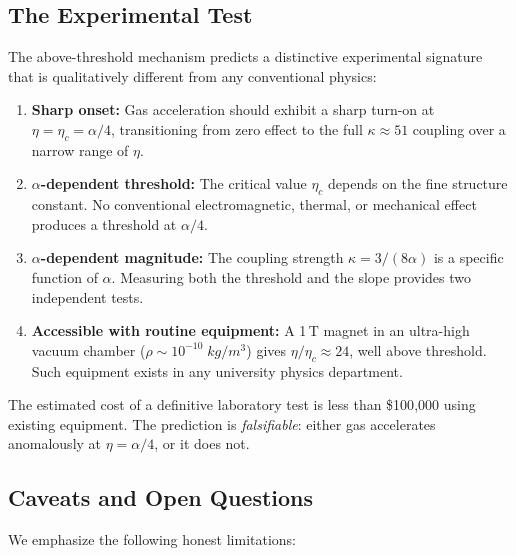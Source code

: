 \documentclass[twocolumn,prl,superscriptaddress,nofootinbib,longbibliography,floatfix]{revtex4-2}
\begin{document}
\subsection{The Experimental Test}\label{ssec:threshold-experiment}

The above-threshold mechanism predicts a distinctive experimental
signature that is qualitatively different from any conventional physics:

\begin{enumerate}[label=(\roman*)]
\item \textbf{Sharp onset:} Gas acceleration should exhibit a sharp turn-on
at $\eta = \eta_c = \alpha/4$, transitioning from zero effect to the
full $\kappa \approx 51$ coupling over a narrow range of $\eta$.

\item \textbf{$\alpha$-dependent threshold:} The critical value $\eta_c$
depends on the fine structure constant.  No conventional electromagnetic,
thermal, or mechanical effect produces a threshold at $\alpha/4$.

\item \textbf{$\alpha$-dependent magnitude:} The coupling strength
$\kappa = 3/(8\alpha)$ is a specific function of $\alpha$.  Measuring
both the threshold and the slope provides two independent tests.

\item \textbf{Accessible with routine equipment:} A 1\,T magnet in an
ultra-high vacuum chamber ($\rho \sim 10^{-10}\;\si{kg/m^3}$) gives
$\eta/\eta_c \approx 24$, well above threshold.  Such equipment exists
in any university physics department.
\end{enumerate}

\noindent The estimated cost of a definitive laboratory test is less than
\$100{,}000 using existing equipment.  The prediction is
\emph{falsifiable}: either gas accelerates anomalously at
$\eta = \alpha/4$, or it does not.

\subsection{Caveats and Open Questions}\label{ssec:caveats}

We emphasize the following honest limitations:
\end{document}
